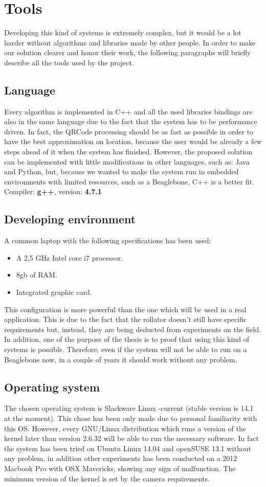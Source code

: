 \chapter{Tools}
Developing this kind of systems is extremely complex, but it would be a lot harder without algorithms and libraries made by other people.
In order to make our solution clearer and honor their work, the following paragraphs will briefly describe all the tools used by the project.

\section{Language}
Every algorithm is implemented in C++ and all the used libraries bindings are also in the same language due to the fact that the system has to be performance driven. In fact, the QRCode processing should be as fast as possible in order to have the best approximation on location, because the user would be already a few steps ahead of it when the system has finished. However, the proposed solution can be implemented with little modifications in other languages, such as: Java and Python, but, because we wanted to make the system run in embedded environments with limited resources, such as a Beaglebone, C++ is a better fit.
\newline Compiler: \textbf{g++},  version: \textbf{4.7.1}


\section{Developing environment}
A common laptop with the following specifications has been used:
\begin{itemize}
  \item A 2,5 GHz Intel core i7 processor.
  \item 8gb of RAM.
  \item Integrated graphic card.
\end{itemize}
This configuration is more powerful than the one which will be used in a real application. This is due to the fact that the rollator doesn't still have specific requirements but, instead, they are being deducted from experiments on the field. In addition, one of the purpose of the thesis is to proof that using this kind of systems is possible. Therefore, even if the system will not be able to run on a Beaglebone now, in a couple of years it should work without any problem.

\section{Operating system}
The chosen operating system is Slackware Linux -current (stable version is 14.1 at the moment). This chose has been only made due to personal familiarity with this OS.
However, every GNU/Linux distribution which runs a version of the kernel later than version 2.6.32 will be able to run the necessary software. In fact the system has been tried on Ubuntu Linux 14.04 and openSUSE 13.1 without any problem, in addition other experiments has been conducted on a 2012 Macbook Pro with OSX Mavericks, showing any sign of malfunction. The minimum version of the kernel is set by the camera requirements.  

